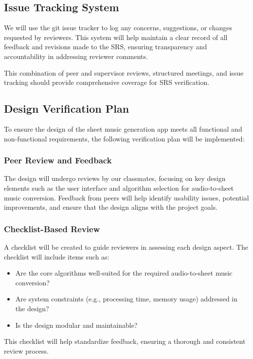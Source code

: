 \documentclass[12pt, titlepage]{article}
\begin{document}
\subsection*{Issue Tracking System}
We will use the git issue tracker to log any concerns, suggestions, or changes requested by reviewers. This system will help maintain a clear record of all feedback and revisions made to the SRS, ensuring transparency and accountability in addressing reviewer comments.

This combination of peer and supervisor reviews, structured meetings, and issue tracking should provide comprehensive coverage for SRS verification.

\subsection{Design Verification Plan}

To ensure the design of the sheet music generation app meets all functional and non-functional requirements, the following verification plan will be implemented:

\subsubsection*{Peer Review and Feedback}
The design will undergo reviews by our classmates, focusing on key design elements such as the user interface and algorithm selection for audio-to-sheet music conversion. Feedback from peers will help identify usability issues, potential improvements, and ensure that the design aligns with the project goals.

\subsubsection*{Checklist-Based Review}
A checklist will be created to guide reviewers in assessing each design aspect. The checklist will include items such as:
\begin{itemize}
    \item Are the core algorithms well-suited for the required audio-to-sheet music conversion?
    \item Are system constraints (e.g., processing time, memory usage) addressed in the design?
    \item Is the design modular and maintainable?
\end{itemize}
This checklist will help standardize feedback, ensuring a thorough and consistent review process.
\end{document}
